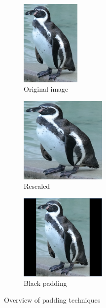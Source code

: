 \begin{figure}
     \centering
     \begin{subfigure}[b]{0.3\textwidth}
         \centering
         \includegraphics[height=4.2cm]{img/original.png}
         \caption{Original image}
         \label{fig:y equals x}
     \end{subfigure}
     \hfill
     \begin{subfigure}[b]{0.3\textwidth}
         \centering
         \includegraphics[height=4.2cm]{img/original-distortion.png}
         \caption{Rescaled}
         \label{fig:three sin x}
     \end{subfigure}
     \hfill
     \begin{subfigure}[b]{0.3\textwidth}
         \centering
         \includegraphics[height=4.2cm]{img/black_padding.png}
         \caption{Black padding}
         \label{fig:five over x}
     \end{subfigure}
        \caption{Overview of padding techniques}
        \label{fig:penguin}
\end{figure}





